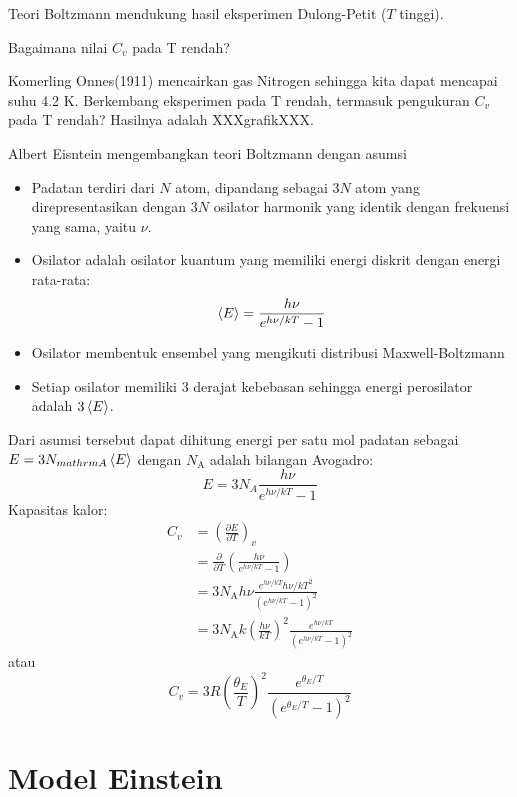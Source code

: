 Teori Boltzmann mendukung hasil eksperimen Dulong-Petit ($T$ tinggi).

Bagaimana nilai $C_{v}$ pada T rendah?

Komerling Onnes(1911) mencairkan gas Nitrogen sehingga kita dapat mencapai
suhu 4.2 K. Berkembang eksperimen pada T rendah, termasuk pengukuran $C_v$
pada T rendah? Hasilnya adalah XXXgrafikXXX.

Albert Eisntein mengembangkan teori Boltzmann dengan asumsi
\begin{itemize}
\item Padatan terdiri dari $N$ atom, dipandang sebagai $3N$ atom yang direpresentasikan
dengan $3N$ osilator harmonik yang identik dengan frekuensi yang sama, yaitu $\nu$.
\item Osilator adalah osilator kuantum yang memiliki energi diskrit dengan energi
rata-rata:
\begin{equation*}
\braket{E} = \frac{h\nu}{e^{h\nu/kT} - 1}
\end{equation*}
\item Osilator membentuk ensembel yang mengikuti distribusi Maxwell-Boltzmann
\item Setiap osilator memiliki 3 derajat kebebasan sehingga energi perosilator
adalah $3\braket{E}$.
\end{itemize}

Dari asumsi tersebut dapat dihitung energi per satu mol padatan sebagai $E = 3N_{mathrm{A}}\braket{E}$
dengan $N_{\mathrm{A}}$ adalah bilangan Avogadro:
\begin{equation*}
E = 3 N_{A} \frac{h\nu}{e^{h\nu/kT} - 1}
\end{equation*}
Kapasitas kalor:
\begin{align*}
C_{v} & = \left( \frac{\partial E}{\partial T} \right)_{v} \\
& = \frac{\partial}{\partial T}\left(
\frac{h\nu}{e^{h\nu/kT} - 1}
\right) \\
& = 3N_{\mathrm{A}}h\nu
\frac{e^{h\nu/kT} h\nu/kT^2}{(e^{h\nu/kT} - 1)^2} \\
& = 3N_{\mathrm{A}}k \left( \frac{h\nu}{kT} \right)^2
\frac{e^{h\nu/kT}}{(e^{h\nu/kT} - 1)^2}
\end{align*}
atau
\begin{equation}
C_{v} = 3R \left(\frac{\theta_{E}}{T}\right)^2
\frac{e^{\theta_{E}/T}}{(e^{\theta_{E}/T} - 1)^2}
\end{equation}

\section{Model Einstein}

